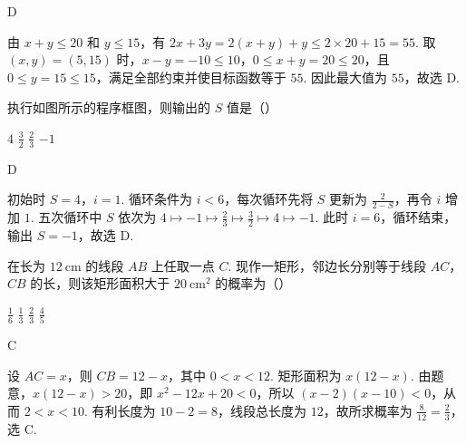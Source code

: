\begin{answer}
D
\end{answer}

\begin{solution}
由 \(x+y\leqslant20\) 和 \(y\leqslant15\)，有 \(2x+3y=2(x+y)+y\leqslant2\times20+15=55\). 取 \((x,y)=(5,15)\) 时，\(x-y=-10\leqslant10\)，\(0\leqslant x+y=20\leqslant20\)，且 \(0\leqslant y=15\leqslant15\)，满足全部约束并使目标函数等于 \(55\). 因此最大值为 \(55\)，故选 D.
\end{solution}

\begin{problem}
执行如图所示的程序框图，则输出的 \(S\) 值是（\quad）


\choices
    {\(4\)}
    {\( \frac{3}{2} \)}
    {\( \frac{2}{3} \)}
    {\(-1\)}
\end{problem}

\begin{answer}
D
\end{answer}

\begin{solution}
初始时 \(S=4\)，\(i=1\). 循环条件为 \(i<6\)，每次循环先将 \(S\) 更新为 \(\displaystyle\frac{2}{2-S}\)，再令 \(i\) 增加 \(1\). 五次循环中 \(S\) 依次为 \(\displaystyle4\longmapsto-1\longmapsto\frac{2}{3}\longmapsto\frac{3}{2}\longmapsto4\longmapsto-1\). 此时 \(i=6\)，循环结束，输出 \(S=-1\)，故选 D.
\end{solution}

\begin{problem}
在长为 \(12 \mathrm{~cm}\) 的线段 \(AB\) 上任取一点 \(C\). 现作一矩形，邻边长分别等于线段 \(AC\)，\(CB\) 的长，则该矩形面积大于 \(20 \mathrm{~cm}^{2}\) 的概率为（\quad）

\choices
    {\(\frac{1}{6}\)}
    {\(\frac{1}{3}\)}
    {\( \frac{2}{3} \)}
    {\(\frac{4}{5}\)}
\end{problem}

\begin{answer}
C
\end{answer}

\begin{solution}
设 \(AC=x\)，则 \(CB=12-x\)，其中 \(0<x<12\). 矩形面积为 \(x(12-x)\). 由题意，\(x(12-x)>20\)，即 \(x^2-12x+20<0\)，所以 \((x-2)(x-10)<0\)，从而 \(2<x<10\). 有利长度为 \(10-2=8\)，线段总长度为 \(12\)，故所求概率为 \(\displaystyle\frac{8}{12}=\frac{2}{3}\)，选 C.
\end{solution}

